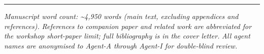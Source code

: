 \begin{center}\rule{0.5\linewidth}{0.5pt}\end{center}

\emph{Manuscript word count: \textasciitilde4,950 words (main text,
excluding appendices and references).} \emph{References to companion
paper and related work are abbreviated for the workshop short-paper
limit; full bibliography is in the cover letter.} \emph{All agent names
are anonymised to Agent-A through Agent-I for double-blind review.}
